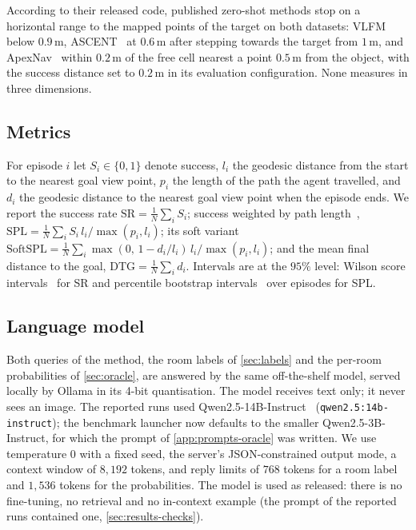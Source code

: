 \documentclass[10pt]{article}
\newcommand{\code}[1]{\texttt{#1}}
\newcommand{\m}{\,\mathrm{m}}
\begin{document}
According to their released code, published zero-shot methods stop on a
horizontal range to the mapped points of the target on both datasets:
VLFM~\citep{yokoyama2024vlfm} below $0.9\m$,
ASCENT~\citep{gong2025stairway} at $0.6\m$ after stepping towards the target
from $1\m$, and ApexNav~\citep{zhang2025apexnav} within $0.2\m$ of the free
cell nearest a point $0.5\m$ from the object, with the success distance set to
$0.2\m$ in its evaluation configuration. None measures in three dimensions.

\subsection{Metrics}\label{sec:experiments-metrics}
For episode $i$ let $S_i\in\{0,1\}$ denote success, $l_i$ the geodesic distance
from the start to the nearest goal view point, $p_i$ the length of the path the
agent travelled, and $d_i$ the geodesic distance to the nearest goal view point
when the episode ends. We report the success rate
$\mathrm{SR}=\tfrac1N\sum_i S_i$; success weighted by path
length~\citep{anderson2018evaluation},
$\mathrm{SPL}=\tfrac1N\sum_i S_i\,l_i/\max(p_i,l_i)$; its soft variant
$\mathrm{SoftSPL}=\tfrac1N\sum_i \max(0,\,1-d_i/l_i)\,l_i/\max(p_i,l_i)$; and
the mean final distance to the goal, $\mathrm{DTG}=\tfrac1N\sum_i d_i$.
Intervals are at the $95\%$ level: Wilson score
intervals~\citep{wilson1927probable} for SR and percentile bootstrap
intervals~\citep{efron1979bootstrap} over episodes for SPL.

\subsection{Language model}\label{sec:experiments-llm}
Both queries of the method, the room labels of \cref{sec:labels} and the
per-room probabilities of \cref{sec:oracle}, are answered by the same
off-the-shelf model, served locally by Ollama in its 4-bit quantisation. The
model receives text only; it never sees an image. The reported runs used
Qwen2.5-14B-Instruct~\citep{qwen25} (\code{qwen2.5:14b-instruct}); the
benchmark launcher now defaults to the smaller Qwen2.5-3B-Instruct, for which
the prompt of \cref{app:prompts-oracle} was written. We use
temperature $0$ with a fixed seed, the server's JSON-constrained output mode, a
context window of $8{,}192$ tokens, and reply limits of $768$ tokens for a room
label and $1{,}536$ tokens for the probabilities. The model is used as
released: there is no fine-tuning, no retrieval and no in-context example
(the prompt of the reported runs contained one, \cref{sec:results-checks}).
\end{document}
